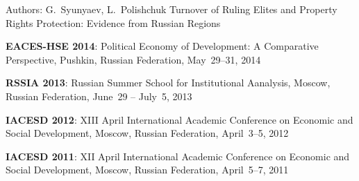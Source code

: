 \begin{cventries}
  \cventry
    {Authors: G.~Syunyaev, L.~Polishchuk} %
    {Turnover of Ruling Elites and Property Rights Protection: Evidence from Russian Regions} %
    {} %
    {} %
    {
      \begin{cvitems} %
        \item {\textbf{EACES-HSE 2014}: Political Economy of Development: A Comparative Perspective, Pushkin, Russian Federation, May~29--31, 2014}
        \item {\textbf{RSSIA 2013}: Russian Summer School for Institutional Aanalysis, Moscow, Russian Federation, June~29 -- July~5, 2013}
        \item {\textbf{IACESD 2012}: XIII April International Academic Conference on Economic and Social Development, Moscow, Russian Federation, April~3--5, 2012}
        \item {\textbf{IACESD 2011}: XII April International Academic Conference on Economic and Social Development, Moscow, Russian Federation, April~5--7, 2011}
      \end{cvitems}
    }

\end{cventries}
